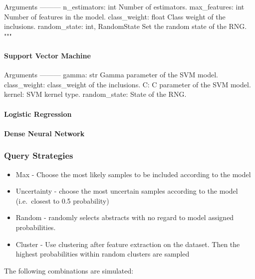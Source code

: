 \documentclass[
]{article}
\providecommand{\tightlist}{%
  \setlength{\itemsep}{0pt}\setlength{\parskip}{0pt}}
\begin{document}
Arguments --------- n\_estimators: int Number of estimators.
max\_features: int Number of features in the model. class\_weight: float
Class weight of the inclusions. random\_state: int, RandomState Set the
random state of the RNG. """

\hypertarget{support-vector-machine}{%
\paragraph{Support Vector Machine}\label{support-vector-machine}}

Arguments --------- gamma: str Gamma parameter of the SVM model.
class\_weight: class\_weight of the inclusions. C: C parameter of the
SVM model. kernel: SVM kernel type. random\_state: State of the RNG.

\hypertarget{logistic-regression}{%
\paragraph{Logistic Regression}\label{logistic-regression}}

\hypertarget{dense-neural-network}{%
\paragraph{\texorpdfstring{\textbf{Dense Neural
Network}}{Dense Neural Network}}\label{dense-neural-network}}

\hypertarget{query-strategies}{%
\subsubsection{Query Strategies}\label{query-strategies}}

\begin{itemize}
\tightlist
\item
  Max - Choose the most likely samples to be included according to the
  model
\item
  Uncertainty - choose the most uncertain samples according to the model
  (i.e.~closest to 0.5 probability) \autocite{Lewis1994}
\item
  Random - randomly selects abstracts with no regard to model assigned
  probabilities.
\item
  Cluster - Use clustering after feature extraction on the dataset. Then
  the highest probabilities within random clusters are sampled
\end{itemize}

The following combinations are simulated:
\end{document}
